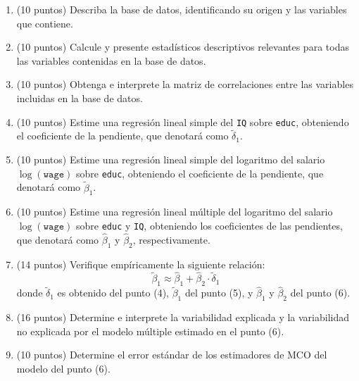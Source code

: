 \documentclass[letterpaper,11pt]{article}
\begin{document}
\begin{enumerate}
\item (10 puntos) Describa la base de datos, identificando su origen y las variables que contiene. 
    \item (10 puntos) Calcule y presente estadísticos descriptivos relevantes para todas las variables contenidas en la base de datos.

\item (10 puntos) Obtenga e interprete la matriz de correlaciones entre las variables incluidas en la base de datos.

\item (10 puntos) Estime una regresión lineal simple del \texttt{IQ} sobre \texttt{educ}, obteniendo el coeficiente de la pendiente, que denotará como $\tilde{\delta}_1$.

\item (10 puntos) Estime una regresión lineal simple del logaritmo del salario $\log(\texttt{wage})$ sobre \texttt{educ}, obteniendo el coeficiente de la pendiente, que denotará como $\tilde{\beta}_1$.

\item (10 puntos) Estime una regresión lineal múltiple del logaritmo del salario $\log(\texttt{wage})$ sobre \texttt{educ} y \texttt{IQ}, obteniendo los coeficientes de las pendientes, que denotará como $\hat{\beta}_1$ y $\hat{\beta}_2$, respectivamente.

\item (14 puntos) Verifique empíricamente la siguiente relación:
\[
\tilde{\beta}_1 \approx \hat{\beta}_1 + \hat{\beta}_2 \cdot \tilde{\delta}_1
\]
donde $\tilde{\delta}_1$ es obtenido del punto (4), $\tilde{\beta}_1$ del punto (5), y $\hat{\beta}_1$ y $\hat{\beta}_2$ del punto (6).

\item (16 puntos) Determine e interprete la variabilidad explicada y la variabilidad no explicada 
 por el modelo múltiple estimado en el punto (6).

 \item (10 puntos) Determine el error estándar de los estimadores de MCO del modelo del punto (6). 
\end{enumerate}
\end{document}
